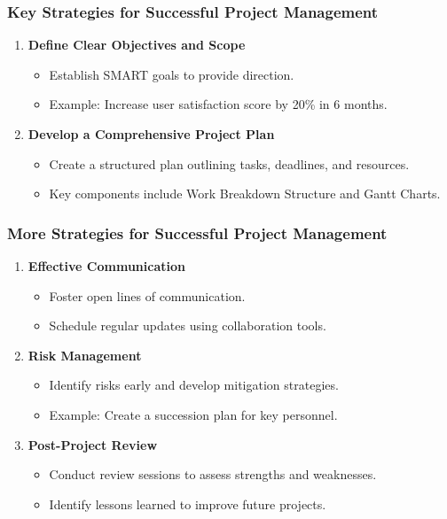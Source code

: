 \documentclass[aspectratio=169]{beamer}
\begin{document}
\begin{frame}[fragile]
  \frametitle{Key Strategies for Successful Project Management}
  \begin{enumerate}
    \item \textbf{Define Clear Objectives and Scope}
      \begin{itemize}
        \item Establish SMART goals to provide direction.
        \item Example: Increase user satisfaction score by 20\% in 6 months.
      \end{itemize}
    
    \item \textbf{Develop a Comprehensive Project Plan}
      \begin{itemize}
        \item Create a structured plan outlining tasks, deadlines, and resources.
        \item Key components include Work Breakdown Structure and Gantt Charts.
      \end{itemize}
  \end{enumerate}
\end{frame}

\begin{frame}[fragile]
  \frametitle{More Strategies for Successful Project Management}
  \begin{enumerate}[resume]
    \item \textbf{Effective Communication}
      \begin{itemize}
        \item Foster open lines of communication.
        \item Schedule regular updates using collaboration tools.
      \end{itemize}

    \item \textbf{Risk Management}
      \begin{itemize}
        \item Identify risks early and develop mitigation strategies.
        \item Example: Create a succession plan for key personnel.
      \end{itemize}
      
    \item \textbf{Post-Project Review}
      \begin{itemize}
        \item Conduct review sessions to assess strengths and weaknesses.
        \item Identify lessons learned to improve future projects.
      \end{itemize}
  \end{enumerate}
\end{frame}
\end{document}

